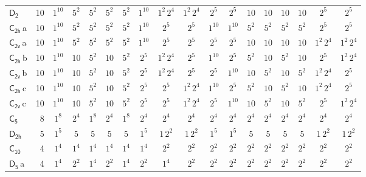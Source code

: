 \documentclass[10pt,a4paper]{article}
\numberwithin{equation}{section}
\newcommand{\grp}[1]{\mathsf{#1}}
\newcommand{\clsletter}[1]{\,{\scriptsize\color{black!55}#1}}
\begin{document}
{\begin{longtable}{@{}lrcccccccccccccccc@{}}
\href{D2.pdf}{$\grp{D_{2}}$} & 10 & $1^{10}$ & $5^{2}$ & $5^{2}$ & $5^{2}$ & $5^{2}$ & $1^{10}$ & $1^{2}\,2^{4}$ & $1^{2}\,2^{4}$ & $2^{5}$ & $2^{5}$ & $10$ & $10$ & $10$ & $10$ & $2^{5}$ & $2^{5}$\\
\href{C2h.pdf}{$\grp{C_{2h}}$}\clsletter{a} & 10 & $1^{10}$ & $5^{2}$ & $5^{2}$ & $5^{2}$ & $5^{2}$ & $1^{10}$ & $2^{5}$ & $2^{5}$ & $1^{10}$ & $1^{10}$ & $5^{2}$ & $5^{2}$ & $5^{2}$ & $5^{2}$ & $2^{5}$ & $2^{5}$\\
\href{C2v.pdf}{$\grp{C_{2v}}$}\clsletter{a} & 10 & $1^{10}$ & $5^{2}$ & $5^{2}$ & $5^{2}$ & $5^{2}$ & $1^{10}$ & $2^{5}$ & $2^{5}$ & $2^{5}$ & $2^{5}$ & $10$ & $10$ & $10$ & $10$ & $1^{2}\,2^{4}$ & $1^{2}\,2^{4}$\\
\href{C2h.pdf}{$\grp{C_{2h}}$}\clsletter{b} & 10 & $1^{10}$ & $10$ & $5^{2}$ & $10$ & $5^{2}$ & $2^{5}$ & $1^{2}\,2^{4}$ & $2^{5}$ & $1^{10}$ & $2^{5}$ & $5^{2}$ & $10$ & $5^{2}$ & $10$ & $2^{5}$ & $1^{2}\,2^{4}$\\
\href{C2v.pdf}{$\grp{C_{2v}}$}\clsletter{b} & 10 & $1^{10}$ & $10$ & $5^{2}$ & $10$ & $5^{2}$ & $2^{5}$ & $1^{2}\,2^{4}$ & $2^{5}$ & $2^{5}$ & $1^{10}$ & $10$ & $5^{2}$ & $10$ & $5^{2}$ & $1^{2}\,2^{4}$ & $2^{5}$\\
\href{C2h.pdf}{$\grp{C_{2h}}$}\clsletter{c} & 10 & $1^{10}$ & $10$ & $5^{2}$ & $10$ & $5^{2}$ & $2^{5}$ & $2^{5}$ & $1^{2}\,2^{4}$ & $1^{10}$ & $2^{5}$ & $5^{2}$ & $10$ & $5^{2}$ & $10$ & $1^{2}\,2^{4}$ & $2^{5}$\\
\href{C2v.pdf}{$\grp{C_{2v}}$}\clsletter{c} & 10 & $1^{10}$ & $10$ & $5^{2}$ & $10$ & $5^{2}$ & $2^{5}$ & $2^{5}$ & $1^{2}\,2^{4}$ & $2^{5}$ & $1^{10}$ & $10$ & $5^{2}$ & $10$ & $5^{2}$ & $2^{5}$ & $1^{2}\,2^{4}$\\
\href{C5.pdf}{$\grp{C_{5}}$} & 8 & $1^{8}$ & $2^{4}$ & $1^{8}$ & $2^{4}$ & $1^{8}$ & $2^{4}$ & $2^{4}$ & $2^{4}$ & $2^{4}$ & $2^{4}$ & $2^{4}$ & $2^{4}$ & $2^{4}$ & $2^{4}$ & $2^{4}$ & $2^{4}$\\
\href{D2h.pdf}{$\grp{D_{2h}}$} & 5 & $1^{5}$ & $5$ & $5$ & $5$ & $5$ & $1^{5}$ & $1\,2^{2}$ & $1\,2^{2}$ & $1^{5}$ & $1^{5}$ & $5$ & $5$ & $5$ & $5$ & $1\,2^{2}$ & $1\,2^{2}$\\
\href{C10.pdf}{$\grp{C_{10}}$} & 4 & $1^{4}$ & $1^{4}$ & $1^{4}$ & $1^{4}$ & $1^{4}$ & $1^{4}$ & $2^{2}$ & $2^{2}$ & $2^{2}$ & $2^{2}$ & $2^{2}$ & $2^{2}$ & $2^{2}$ & $2^{2}$ & $2^{2}$ & $2^{2}$\\
\href{D5.pdf}{$\grp{D_{5}}$}\clsletter{a} & 4 & $1^{4}$ & $2^{2}$ & $1^{4}$ & $2^{2}$ & $1^{4}$ & $2^{2}$ & $1^{4}$ & $2^{2}$ & $2^{2}$ & $2^{2}$ & $2^{2}$ & $2^{2}$ & $2^{2}$ & $2^{2}$ & $2^{2}$ & $2^{2}$\\

\end{longtable}}
\end{document}
